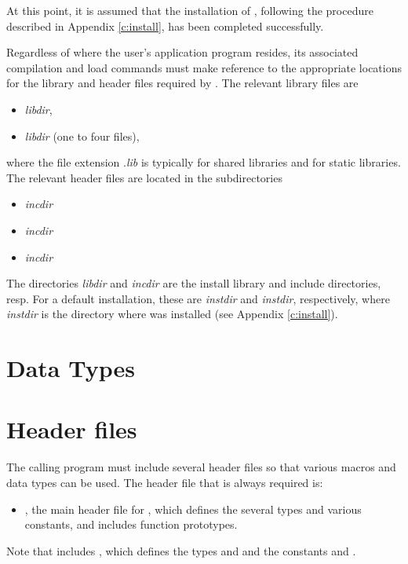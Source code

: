 At this point, it is assumed that the installation of {\cvode},
following the procedure described in Appendix \ref{c:install}, has
been completed successfully.

Regardless of where the user's application program resides, its
associated compilation and load commands must make reference to the
appropriate locations for the library and header files required by
{\cvode}.  The relevant library files are
\begin{itemize}
\item {\em libdir},
\item {\em libdir} (one to four files),
\end{itemize}
where the file extension .{\em lib} is typically  for shared libraries
and  for static libraries. The relevant header files are located in
the subdirectories
\begin{itemize}
\item {\em incdir}
\item {\em incdir}
\item {\em incdir}
\end{itemize}
The directories {\em libdir} and {\em incdir} are the install library and include
directories, resp.  For a default installation, these are {\em instdir} and
{\em instdir}, respectively, where {\em instdir} is the directory
where {\sundials} was installed (see Appendix \ref{c:install}).


\section{Data Types}\label{s:types}


\section{Header files}\label{ss:header_sim}
The calling program must include several header files so that various macros
and data types can be used. The header file that is always required is:
\begin{itemize}
\item  {}, 
  the main header file for {\cvode}, which defines the several
  types and various constants, and includes function prototypes.
\end{itemize}
Note that  includes , 
which defines the types  and 
and the constants  and .

